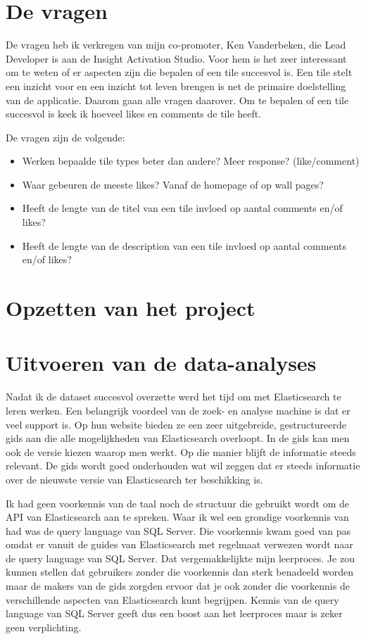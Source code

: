 \section{De vragen}
De vragen heb ik verkregen van mijn co-promoter, Ken Vanderbeken, die Lead Developer is aan de Insight Activation Studio. Voor hem is het zeer interessant om te weten of er aspecten zijn die bepalen of een tile succesvol is. Een tile stelt een inzicht voor en een inzicht tot leven brengen is net de primaire doelstelling van de applicatie. Daarom gaan alle vragen daarover. Om te bepalen of een tile succesvol is keek ik hoeveel likes en comments de tile heeft.

De vragen zijn de volgende:
\begin{itemize}
	\item Werken bepaalde tile types beter dan andere? Meer response? (like/comment) 
	\item Waar gebeuren de meeste likes? Vanaf de homepage of op wall pages?
	\item Heeft de lengte van de titel van een tile invloed op aantal comments en/of likes? 
	\item Heeft de lengte van de description van een tile invloed op aantal comments en/of likes? 
\end{itemize}

\section{Opzetten van het project}


\section{Uitvoeren van de data-analyses}
Nadat ik de dataset succesvol overzette werd het tijd om met Elasticsearch te leren werken. Een belangrijk voordeel van de zoek- en analyse machine is dat er veel support is. Op hun website bieden ze een zeer uitgebreide, gestructureerde gids aan die alle mogelijkheden van Elasticsearch overloopt. In de gids kan men ook de versie kiezen waarop men werkt. Op die manier blijft de informatie steeds relevant. De gids wordt goed onderhouden wat wil zeggen dat er steeds informatie over de nieuwste versie van Elasticsearch ter beschikking is. 

Ik had geen voorkennis van de taal noch de structuur die gebruikt wordt om de API van Elasticsearch aan te spreken. Waar ik wel een grondige voorkennis van had was de query language van SQL Server. Die voorkennis kwam goed van pas omdat er vanuit de guides van Elasticsearch met regelmaat verwezen wordt naar de query language van SQL Server. Dat vergemakkelijkte mijn leerproces. Je zou kunnen stellen dat gebruikers zonder die voorkennis dan sterk benadeeld worden maar de makers van de gids zorgden ervoor dat je ook zonder die voorkennis de verschillende aspecten van Elasticsearch kunt begrijpen. Kennis van de query language van SQL Server geeft dus een boost aan het leerproces maar is zeker geen verplichting.


